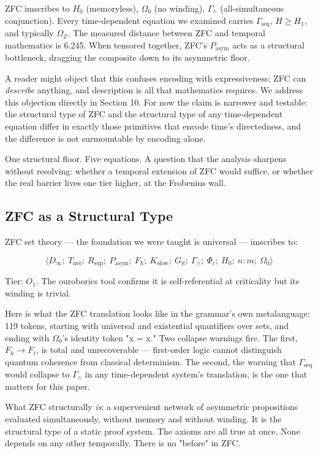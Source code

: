 \documentclass[12pt,a4paper]{article}
\begin{document}
ZFC imscribes to $H_0$ (memoryless), $\Omega_0$ (no winding), $\Gamma_{\wedge}$ (all-simultaneous conjunction). Every time-dependent equation we examined carries $\Gamma_\text{seq}$, $H \geq H_1$, and typically $\Omega_\mathbb{Z}$. The measured distance between ZFC and temporal mathematics is 6.245. When tensored together, ZFC's $P_\text{asym}$ acts as a structural bottleneck, dragging the composite down to its asymmetric floor.

A reader might object that this confuses encoding with expressiveness: ZFC can \emph{describe} anything, and description is all that mathematics requires. We address this objection directly in Section 10. For now the claim is narrower and testable: the structural type of ZFC and the structural type of any time-dependent equation differ in exactly those primitives that encode time's directedness, and the difference is not surmountable by encoding alone.

One structural floor. Five equations. A question that the analysis sharpens without resolving: whether a temporal extension of ZFC would suffice, or whether the real barrier lives one tier higher, at the Frobenius wall.

\subsection{ZFC as a Structural Type}

ZFC set theory --- the foundation we were taught is universal --- imscribes to:

\[\langle D_{\infty};\ T_\text{net};\ R_\text{sup};\ P_\text{asym};\ F_{\hbar};\ K_\text{slow};\ G_{\aleph};\ \Gamma_{\wedge};\ \Phi_c;\ H_0;\ n{:}m;\ \Omega_0 \rangle\]

Tier: $O_1$. The ouroborics tool confirms it is self-referential at criticality but its winding is trivial.

Here is what the ZFC translation looks like in the grammar's own metalanguage: 119 tokens, starting with universal and existential quantifiers over sets, and ending with $\Omega_0$'s identity token "x = x." Two collapse warnings fire. The first, $F_{\hbar} \to F_{\ell}$, is total and unrecoverable --- first-order logic cannot distinguish quantum coherence from classical determinism. The second, the warning that $\Gamma_\text{seq}$ would collapse to $\Gamma_{\wedge}$ in any time-dependent system's translation, is the one that matters for this paper.

What ZFC structurally \emph{is}: a supervenient network of asymmetric propositions evaluated simultaneously, without memory and without winding. It is the structural type of a static proof system. The axioms are all true at once. None depends on any other temporally. There is no "before" in ZFC.
\end{document}
